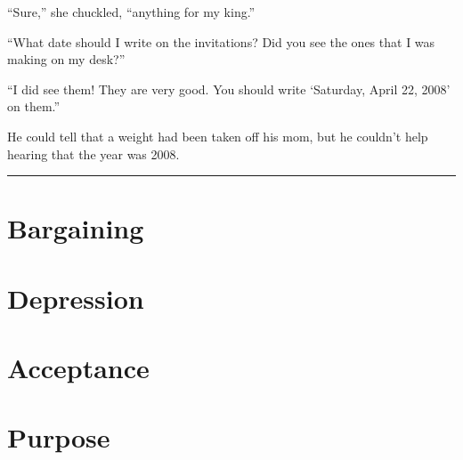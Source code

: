 \documentclass[9pt]{memoir}
\renewcommand{\line}{\noindent \rule{\textwidth}{1pt} \vspace{1em}}
\begin{document}
``Sure,'' she chuckled, ``anything for my king.''

``What date should I write on the invitations? Did you see the ones that I was making on my desk?''

``I did see them! They are very good. You should write `Saturday, April 22, 2008' on them.''

He could tell that a weight had been taken off his mom, but he couldn't help hearing that the year was 2008.

\line




\chapter*{Bargaining}



\chapter*{Depression}



\chapter*{Acceptance}



\chapter*{Purpose}
\end{document}
